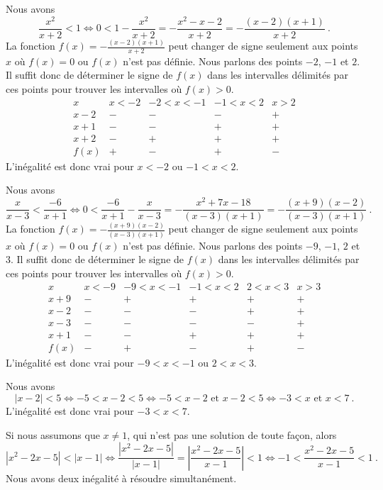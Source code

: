 { Nous avons
\[
  \frac{x^2}{x+2}  < 1 \Leftrightarrow 0 < 1 - \frac{x^2}{x+2} 
= - \frac{x^2 -x - 2}{x+2} = -\frac{(x-2)(x+1)}{x+2} \ .
\]
La fonction $\displaystyle f(x) = -\frac{(x-2)(x+1)}{x+2}$ peut changer de
signe seulement aux points $x$ où $f(x) = 0$ ou $f(x)$ n'est pas
définie.  Nous parlons des points $-2$, $-1$ et $2$.  Il suffit donc
de déterminer le signe de $f(x)$ dans les intervalles délimités par
ces points pour trouver les intervalles où $f(x) > 0$.
\[
\begin{array}{c|c|c|c|c}
x & x < -2 & -2 < x <-1 & -1 < x < 2 & x > 2 \\
\hline
x-2 & - & - & - & + \\
\hline
x+1 & - & - & + & + \\
\hline
x+2 & - & + & + & + \\
\hline
f(x) & + & - & + & -
\end{array}
\]
L'inégalité est donc vrai pour $x < -2$ ou $-1<x < 2$.

 Nous avons
\[
\frac{x}{x-3}  < \frac{-6}{x+1} \Leftrightarrow 
0 < \frac{-6}{x+1} - \frac{x}{x-3}
= - \frac{x^2 + 7x - 18}{(x-3)(x+1)}
= - \frac{(x+9)(x-2)}{(x-3)(x+1)} \ .
\]
La fonction $\displaystyle f(x) = -\frac{(x+9)(x-2)}{(x-3)(x+1)}$
peut changer de signe seulement aux points $x$ où $f(x) = 0$ ou $f(x)$
n'est pas définie.  Nous parlons des points $-9$, $-1$, $2$ et $3$.  Il
suffit donc de déterminer le signe de $f(x)$ dans les intervalles
délimités par ces points pour trouver les intervalles où $f(x) > 0$.
\[
\begin{array}{c|c|c|c|c|c}
x & x < -9 & -9 < x <-1 & -1 < x < 2 & 2 < x < 3 & x > 3 \\
\hline
x+9 & - & + & + & + & + \\
\hline
x-2 & - & - & - & + & + \\
\hline
x-3 & - & - & - & - & + \\
\hline
x+1 & - & - & + & + & + \\
\hline
f(x) & - & + & - & + & - 
\end{array}
\]
L'inégalité est donc vrai pour $-9<x<-1$ ou $2<x<3$.

 Nous avons
\[
|x-2| < 5 \Leftrightarrow -5 < x-2 < 5
\Leftrightarrow -5 <x-2 \text{ et } x-2<5
\Leftrightarrow -3 <x \text{ et } x<7 \ .
\]
L'inégalité est donc vrai pour $-3 < x < 7$.

 Si nous assumons que $x \neq 1$, qui n'est pas une solution de toute
façon, alors
\[
|x^2-2x - 5| < |x-1| \Leftrightarrow
\frac{|x^2-2x - 5|}{|x-1|} = \left|\frac{x^2-2x - 5}{x-1}\right| < 1
\Leftrightarrow 
-1 < \frac{x^2-2x - 5}{x-1} < 1 \ .
\]
Nous avons deux inégalité à résoudre simultanément.

}
